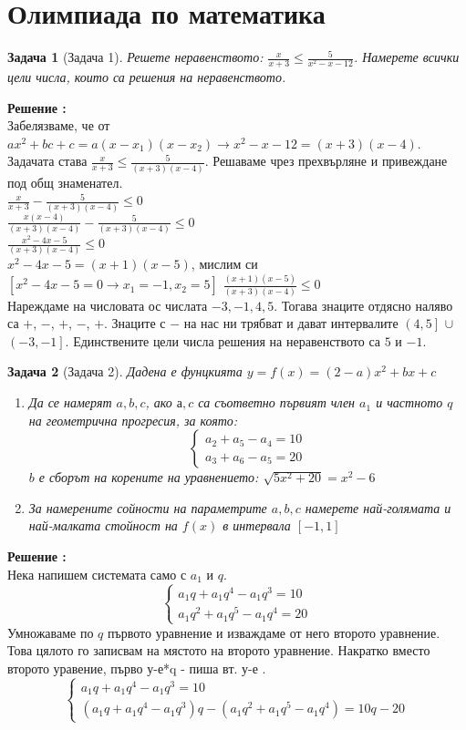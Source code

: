 \documentclass{article}
\newtheorem{problem}{Задача}
\newcounter{solution}
\newcommand\solution{%
	\stepcounter{solution}%
	\textbf{Решение :}\\%
}
\begin{document}
\section{Олимпиада по математика}
\begin{problem}[Задача 1]
	Решете неравенството: $\frac{x}{x+3} \leq \frac{5}{x^2-x-12}$. Намерете всички цели числа, които са решения на неравенството.
\end{problem}

\solution Забелязваме, че от $ax^2 + bc +c = a(x-x_1)(x-x_2) \to x^2-x-12 = (x+3)(x-4)$. Задачата става $\frac{x}{x+3} \leq \frac{5}{(x+3)(x-4)}$. Решаваме чрез прехвърляне и привеждане под общ знаменател. \\
$\frac{x}{x+3} - \frac{5}{(x+3)(x-4)} \leq 0$ \\
$\frac{x(x-4)}{(x+3)(x-4)} - \frac{5}{(x+3)(x-4)} \leq 0$ \\
$ \frac{x^2-4x-5}{(x+3)(x-4)} \leq 0$ \\
$ x^2 -4x - 5 = (x+1)(x-5)$, мислим си  $ [ x^2 -4x - 5 =0  \to x_1 = -1, x_2 =5]  $
$ \frac{(x+1)(x-5)}{(x+3)(x-4)} \leq 0$ \\
Нареждаме на числовата ос числата $-3,-1,4,5$. Тогава знаците отдясно наляво са $+$, $-$,  $+$, $-$, $+$. Знаците с $-$ на нас ни трябват и дават интервалите $\left( 4,5 \right]$ $\cup $ $\left(-3,-1 \right] $. Единствените цели числа решения на неравенството са $5$ и $-1$.
\begin{problem}[Задача 2]
	Дадена е фунцкията $y=f(x) = (2-a)x^2 +bx +c  $ 
	\begin{enumerate}
		\item Да се намерят $a,b,c$, ако $а,c$  са съответно първият член $a_1$ и частното $q$ на геометрична прогресия, за която:
		\[
		\begin{cases}
		a_2 + a_5 - a_4 = 10 \\
		a_3 + a_6 - a_5  = 20  
		\end{cases}
		\]
		$b$ е сборът на корените на уравнението: $\sqrt{5x^2 +20} = x^2-6$ \\
		
		\item За намерените сойности на параметрите $a,b,c$ намерете най-голямата и най-малката стойност на $f(x)$ в интервала $[-1,1] $ 
		
	\end{enumerate}

\end{problem}
\solution  Нека напишем системата само с $a_1$ и $q$.
		\[
\begin{cases}
a_1 q + a_1 q^4- a_1q^3 = 10 \\
a_1q^2 + a_1q^5 - a_1q^4  = 20  
\end{cases}
\]
Умножаваме по $q$ първото уравнение и изваждаме от него второто уравнение. Това цялото го записвам на мястото на второто уравнение. Накратко вместо второто уравение,  първо у-е*q - пиша вт. у-е .
		\[
\begin{cases}
a_1 q + a_1 q^4- a_1q^3 = 10 \\
(a_1 q + a_1 q^4- a_1q^3)q - (a_1q^2 + a_1q^5 - a_1q^4)  =10q - 20  
\end{cases}
\]
\end{document}
